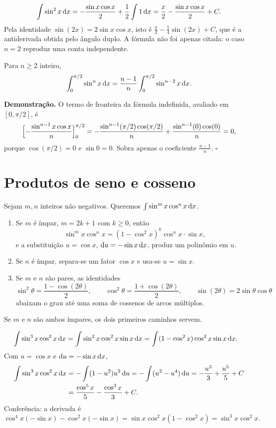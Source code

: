 \documentclass[11pt,a4paper]{article}
\begin{document}
\begin{exemplo}[A fórmula com \(n=2\)]
\[
\int\sin^{2}x\,\mathrm{d} x
=-\frac{\sin x\cos x}{2}+\frac{1}{2}\int 1\,\mathrm{d} x
=\frac{x}{2}-\frac{\sin x\cos x}{2}+C.
\]
Pela identidade \(\sin(2x)=2\sin x\cos x\), isto é \(\frac{x}{2}-\frac{1}{4}\sin(2x)+C\), que é a antiderivada obtida pelo ângulo duplo. A fórmula não foi apenas citada: o caso \(n=2\) reproduz uma conta independente.
\end{exemplo}

\begin{corolario}
Para \(n\ge 2\) inteiro,
\[
\int_0^{\pi/2}\sin^{n}x\,\mathrm{d} x
=\frac{n-1}{n}\int_0^{\pi/2}\sin^{n-2}x\,\mathrm{d} x.
\]
\end{corolario}

\noindent\textbf{Demonstração.}
O termo de fronteira da fórmula indefinida, avaliado em \([0,\pi/2]\), é
\[
\Bigl[-\frac{\sin^{n-1}x\cos x}{n}\Bigr]_0^{\pi/2}
=-\frac{\sin^{n-1}(\pi/2)\cos(\pi/2)}{n}+\frac{\sin^{n-1}(0)\cos(0)}{n}
=0,
\]
porque \(\cos(\pi/2)=0\) e \(\sin 0=0\). Sobra apenas o coeficiente \(\frac{n-1}{n}\).
\hfill\(\square\)

\section{Produtos de seno e cosseno}

Sejam \(m,n\) inteiros não negativos. Queremos \(\int\sin^{m}x\cos^{n}x\,\mathrm{d} x\).

\begin{teorema}
\begin{enumerate}
\item Se \(m\) é ímpar, \(m=2k+1\) com \(k\ge 0\), então
\[
\sin^{m}x\cos^{n}x
=(1-\cos^{2}x)^{k}\cos^{n}x\cdot\sin x,
\]
e a substituição \(u=\cos x\), \(\mathrm{d} u=-\sin x\,\mathrm{d} x\), produz um polinômio em \(u\).
\item Se \(n\) é ímpar, separa-se um fator \(\cos x\) e usa-se \(u=\sin x\).
\item Se \(m\) e \(n\) são pares, as identidades
\[
\sin^{2}\theta=\frac{1-\cos(2\theta)}{2},\qquad
\cos^{2}\theta=\frac{1+\cos(2\theta)}{2},\qquad
\sin(2\theta)=2\sin\theta\cos\theta
\]
abaixam o grau até uma soma de cossenos de arcos múltiplos.
\end{enumerate}
Se \(m\) e \(n\) são ambos ímpares, os dois primeiros caminhos servem.
\end{teorema}

\begin{exemplo}
\begin{align*}
\int\sin^{3}x\cos^{2}x\,\mathrm{d} x
&=\int\sin^{2}x\cos^{2}x\sin x\,\mathrm{d} x
=\int(1-\cos^{2}x)\cos^{2}x\sin x\,\mathrm{d} x.
\end{align*}
Com \(u=\cos x\) e \(\mathrm{d} u=-\sin x\,\mathrm{d} x\),
\begin{align*}
\int\sin^{3}x\cos^{2}x\,\mathrm{d} x
&=-\int(1-u^{2})u^{2}\,\mathrm{d} u
=-\int(u^{2}-u^{4})\,\mathrm{d} u
=-\frac{u^{3}}{3}+\frac{u^{5}}{5}+C\\
&=\frac{\cos^{5}x}{5}-\frac{\cos^{3}x}{3}+C.
\end{align*}
Conferência: a derivada é
\[
\cos^{4}x(-\sin x)-\cos^{2}x(-\sin x)
=\sin x\cos^{2}x(1-\cos^{2}x)
=\sin^{3}x\cos^{2}x.
\]
\end{exemplo}
\end{document}

